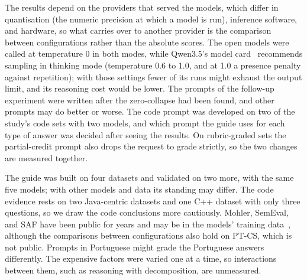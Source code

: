 The results depend on the providers that served the models, which differ in quantisation (the numeric precision
at which a model is run), inference software, and hardware, so what carries over to another provider is the
comparison between configurations rather than the absolute scores. The open models were called at temperature 0 in both modes, while Qwen3.5's model
card~\cite{qwen_qwen35_2026} recommends sampling in thinking mode (temperature 0.6 to 1.0, and at 1.0 a presence
penalty against repetition); with those settings fewer of its runs might exhaust the output limit, and its
reasoning cost would be lower. The prompts of the follow-up experiment were
written after the zero-collapse had been found, and other prompts may do better or worse. The code prompt was
developed on two of the study's code sets with two models, and which prompt the guide uses for each type of answer
was decided after seeing the results. On rubric-graded
sets the partial-credit prompt also drops the request to grade strictly, so the two changes are measured
together.

The guide was built on four datasets and validated on two more, with the same five models; with other models
and data its standing may differ. The code evidence rests on two Java-centric datasets and one C++ dataset with
only three questions, so we draw the code conclusions more cautiously. Mohler, SemEval, and SAF have been public
for years and may be in the models' training data~\cite{sainz_contamination_2023}, although the comparisons
between configurations also hold on PT-CS, which is not public. Prompts in Portuguese might grade the Portuguese
answers differently. The expensive factors were varied one at a time, so interactions between them, such as
reasoning with decomposition, are unmeasured.
